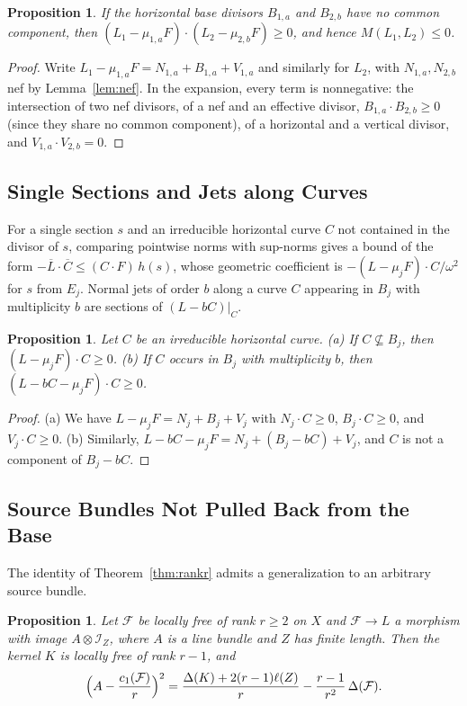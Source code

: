 \documentclass[11pt]{article}
\newtheorem{proposition}[theorem]{Proposition}
\theoremstyle{definition}
\theoremstyle{remark}
\newcommand{\cI}{\mathcal{I}}
\newcommand{\cF}{\mathcal{F}}
\newcommand{\Lb}{\overline{L}}
\begin{document}
\begin{proposition}\label{prop:cross}
If the horizontal base divisors $B_{1,a}$ and $B_{2,b}$ have no common component,
then $(L_1-\mu_{1,a}F)\cdot(L_2-\mu_{2,b}F)\ge 0$, and hence $M(L_1,L_2)\le 0$.
\end{proposition}

\begin{proof}
Write $L_1-\mu_{1,a}F=N_{1,a}+B_{1,a}+V_{1,a}$ and similarly for $L_2$, with
$N_{1,a},N_{2,b}$ nef by Lemma~\ref{lem:nef}. In the expansion, every term is
nonnegative: the intersection of two nef divisors, of a nef and an effective
divisor, $B_{1,a}\cdot B_{2,b}\ge 0$ (since they share no common component), of a
horizontal and a vertical divisor, and $V_{1,a}\cdot V_{2,b}=0$.
\end{proof}

\subsection{Single Sections and Jets along Curves}
For a single section $s$ and an irreducible horizontal curve $C$ not contained in
the divisor of $s$, comparing pointwise norms with sup-norms gives a bound of the
form $-\Lb\cdot\overline C\le(C\cdot F)\,h(s)$, whose geometric coefficient is
$-(L-\mu_jF)\cdot C/\omega^2$ for $s$ from $E_j$. Normal jets of order $b$ along a
curve $C$ appearing in $B_j$ with multiplicity $b$ are sections of $(L-bC)|_C$.

\begin{proposition}\label{prop:curves}
Let $C$ be an irreducible horizontal curve. (a) If $C\not\subseteq B_j$, then
$(L-\mu_jF)\cdot C\ge 0$. (b) If $C$ occurs in $B_j$ with multiplicity $b$, then
$(L-bC-\mu_jF)\cdot C\ge 0$.
\end{proposition}

\begin{proof}
(a) We have $L-\mu_jF=N_j+B_j+V_j$ with $N_j\cdot C\ge 0$, $B_j\cdot C\ge 0$, and
$V_j\cdot C\ge 0$. (b) Similarly, $L-bC-\mu_jF=N_j+(B_j-bC)+V_j$, and $C$ is not a
component of $B_j-bC$.
\end{proof}

\subsection{Source Bundles Not Pulled Back from the Base}
The identity of Theorem~\ref{thm:rankr} admits a generalization to an arbitrary
source bundle.

\begin{proposition}\label{prop:universal}
Let $\cF$ be locally free of rank $r\ge 2$ on $X$ and $\cF\to L$ a morphism with
image $A\otimes\cI_Z$, where $A$ is a line bundle and $Z$ has finite length. Then
the kernel $K$ is locally free of rank $r-1$, and
\[
\Bigl(A-\frac{c_1(\cF)}{r}\Bigr)^2=\frac{\Delta(K)+2(r-1)\ell(Z)}{r}-\frac{r-1}{r^2}\,\Delta(\cF).
\]
\end{proposition}
\end{document}
